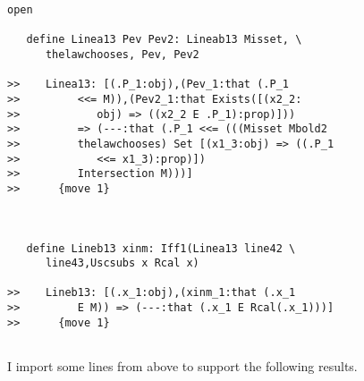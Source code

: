 \documentclass[12pt]{article}
\begin{document}
\begin{verbatim}
open

   define Linea13 Pev Pev2: Lineab13 Misset, \
      thelawchooses, Pev, Pev2

>>    Linea13: [(.P_1:obj),(Pev_1:that (.P_1
>>         <<= M)),(Pev2_1:that Exists([(x2_2:
>>            obj) => ((x2_2 E .P_1):prop)]))
>>         => (---:that (.P_1 <<= (((Misset Mbold2
>>         thelawchooses) Set [(x1_3:obj) => ((.P_1
>>            <<= x1_3):prop)])
>>         Intersection M)))]
>>      {move 1}



   define Lineb13 xinm: Iff1(Linea13 line42 \
      line43,Uscsubs x Rcal x)

>>    Lineb13: [(.x_1:obj),(xinm_1:that (.x_1
>>         E M)) => (---:that (.x_1 E Rcal(.x_1)))]
>>      {move 1}


\end{verbatim}

I import some lines from above to support the following results.
\end{document}
